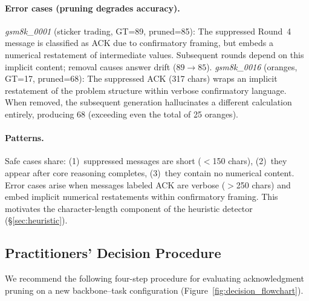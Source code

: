 \paragraph{Error cases (pruning degrades accuracy).}
\emph{gsm8k\_0001} (sticker trading, GT=89, pruned=85): The suppressed Round~4 message is classified as ACK due to confirmatory framing, but embeds a numerical restatement of intermediate values. Subsequent rounds depend on this implicit content; removal causes answer drift ($89 \to 85$).
\emph{gsm8k\_0016} (oranges, GT=17, pruned=68): The suppressed ACK (317 chars) wraps an implicit restatement of the problem structure within verbose confirmatory language. When removed, the subsequent generation hallucinates a different calculation entirely, producing 68 (exceeding even the total of 25 oranges).

\paragraph{Patterns.}
Safe cases share: (1)~suppressed messages are short ($<$150 chars), (2)~they appear after core reasoning completes, (3)~they contain no numerical content. Error cases arise when messages labeled ACK are verbose ($>$250 chars) and embed implicit numerical restatements within confirmatory framing. This motivates the character-length component of the heuristic detector (\S\ref{sec:heuristic}).

\subsection{Practitioners' Decision Procedure}
\label{app:flowchart}

We recommend the following four-step procedure for evaluating acknowledgment pruning on a new backbone--task configuration (Figure~\ref{fig:decision_flowchart}).

